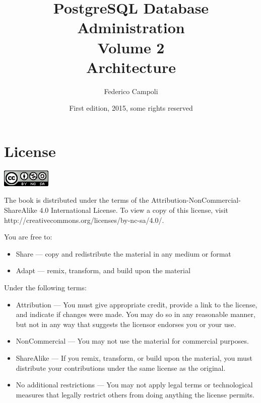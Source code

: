 \documentclass[oneside]{book}
\author{Federico Campoli}
\title{PostgreSQL Database Administration \\ Volume 2 \\ Architecture}
\date{First edition, 2015, some rights reserved}
\begin{document}

\maketitle



\chapter*{License}
\begin{center}
 \includegraphics{images/cc_logo.png}
\end{center}

The book is distributed under the terms of the Attribution-NonCommercial-ShareAlike 4.0 International 
License. To view a copy of this license, visit http://creativecommons.org/licenses/by-nc-sa/4.0/.\newline


You are free to:
\begin{itemize}
 
\item     Share — copy and redistribute the material in any medium or format
\item     Adapt — remix, transform, and build upon the material

\end{itemize}


Under the following terms:
\begin{itemize}
\item    Attribution — You must give appropriate credit, provide a link to the license, and indicate if 
changes were made. You may do so in any reasonable manner, but not in any way that suggests the licensor 
endorses you or your use.

\item    NonCommercial — You may not use the material for commercial purposes.

\item    ShareAlike — If you remix, transform, or build upon the material, you must distribute your 
contributions under the same license as the original.

\item    No additional restrictions — You may not apply legal terms or technological measures that legally 
restrict others from doing anything the license permits.

\end{itemize}
\end{document}
